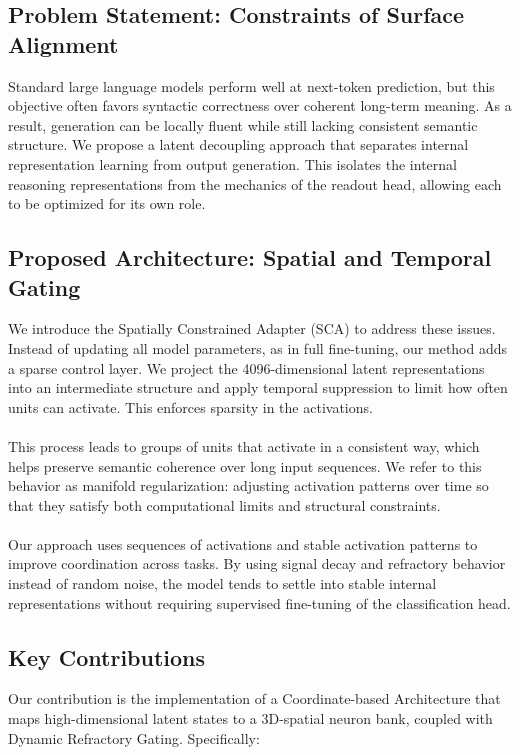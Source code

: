 \documentclass[11pt, letterpaper]{article}
\begin{document}
\subsection{Problem Statement: Constraints of Surface Alignment}
Standard large language models perform well at next-token prediction, but this objective often favors syntactic correctness over coherent long-term meaning. As a result, generation can be locally fluent while still lacking consistent semantic structure. We propose a latent decoupling approach that separates internal representation learning from output generation. This isolates the internal reasoning representations from the mechanics of the readout head, allowing each to be optimized for its own role.

\subsection{Proposed Architecture: Spatial and Temporal Gating}
We introduce the Spatially Constrained Adapter (SCA) to address these issues. Instead of updating all model parameters, as in full fine-tuning, our method adds a sparse control layer. We project the 4096-dimensional latent representations into an intermediate structure and apply temporal suppression to limit how often units can activate. This enforces sparsity in the activations.

\paragraph{}
This process leads to groups of units that activate in a consistent way, which helps preserve semantic coherence over long input sequences. We refer to this behavior as manifold regularization: adjusting activation patterns over time so that they satisfy both computational limits and structural constraints.

\paragraph{}
Our approach uses sequences of activations and stable activation patterns to improve coordination across tasks. By using signal decay and refractory behavior instead of random noise, the model tends to settle into stable internal representations without requiring supervised fine-tuning of the classification head.

\subsection{Key Contributions} 
Our contribution is the implementation of a Coordinate-based Architecture that maps high-dimensional latent states to a 3D-spatial neuron bank, coupled with Dynamic Refractory Gating. Specifically:
\end{document}
